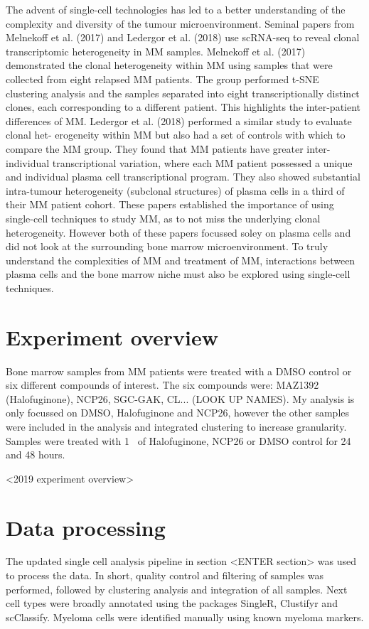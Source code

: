 The advent of single-cell technologies has led to a better understanding of the complexity and diversity of the tumour microenvironment.
Seminal papers from Melnekoff et al. (2017)\cite{melnekoff2017single} and Ledergor et al. (2018)\cite{ledergor2018single} use scRNA-seq to reveal clonal transcriptomic heterogeneity in MM samples.
Melnekoff et al. (2017) demonstrated the clonal heterogeneity within MM using samples that were collected from eight relapsed MM patients.
The group performed t-SNE clustering analysis and the samples separated into eight transcriptionally distinct clones, each corresponding to a different patient.
This highlights the inter-patient differences of MM\@.
Ledergor et al. (2018) performed a similar study to evaluate clonal het- erogeneity within MM but also had a set of controls with which to compare the MM group.
They found that MM patients have greater inter-individual transcriptional variation, where each MM patient possessed a unique and individual plasma cell transcriptional program.
They also showed substantial intra-tumour heterogeneity (subclonal structures) of plasma cells in a third of their MM patient cohort.
These papers established the importance of using single-cell techniques to study MM, as to not miss the underlying clonal heterogeneity.
However both of these papers focussed soley on plasma cells and did not look at the surrounding bone marrow microenvironment.
To truly understand the complexities of MM and treatment of MM, interactions between plasma cells and the bone marrow niche must also be explored using single-cell techniques.


\section{Experiment overview}
Bone marrow samples from MM patients were treated with a DMSO control or six different compounds of interest.
The six compounds were: MAZ1392 (Halofuginone), NCP26, SGC-GAK, CL... (LOOK UP NAMES).
My analysis is only focussed on DMSO, Halofuginone and NCP26, however the other samples were included in the analysis and integrated clustering to increase  granularity.
Samples were treated with 1\si{\micro\Molar} of Halofuginone, NCP26 or DMSO control for 24 and 48 hours.

<2019 experiment overview>

\section{Data processing}
The updated single cell analysis pipeline in section <ENTER section> was used to process the data.
In short, quality control and filtering of samples was performed, followed by clustering analysis and integration of all samples.
Next cell types were broadly annotated using the packages SingleR, Clustifyr and scClassify.
Myeloma cells were identified manually using known myeloma markers.

